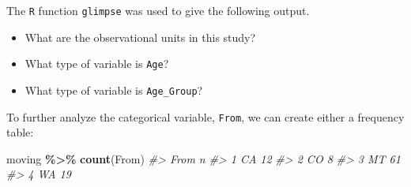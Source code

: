 \documentclass[
]{report}
\newenvironment{Shaded}{\begin{snugshade}}{\end{snugshade}}
\newcommand{\CommentTok}[1]{\textcolor[rgb]{0.56,0.35,0.01}{\textit{#1}}}
\newcommand{\FunctionTok}[1]{\textcolor[rgb]{0.13,0.29,0.53}{\textbf{#1}}}
\newcommand{\NormalTok}[1]{#1}
\newcommand{\SpecialCharTok}[1]{\textcolor[rgb]{0.81,0.36,0.00}{\textbf{#1}}}
\providecommand{\tightlist}{%
  \setlength{\itemsep}{0pt}\setlength{\parskip}{0pt}}
\begin{document}
The \texttt{R} function \texttt{glimpse} was used to give the following output.

\begin{Shaded}
\end{Shaded}

\begin{itemize}
\tightlist
\item
  What are the observational units in this study?
\end{itemize}

\vspace{0.3in}

\begin{itemize}
\tightlist
\item
  What type of variable is \texttt{Age}?
\end{itemize}

\vspace{0.3in}

\begin{itemize}
\tightlist
\item
  What type of variable is \texttt{Age\_Group}?
\end{itemize}

To further analyze the categorical variable, \texttt{From}, we can create either a frequency table:

\begin{Shaded}
\begin{Highlighting}[]
\NormalTok{moving }\SpecialCharTok{\%\textgreater{}\%}
    \FunctionTok{count}\NormalTok{(From)}
\CommentTok{\#\textgreater{}   From  n}
\CommentTok{\#\textgreater{} 1   CA 12}
\CommentTok{\#\textgreater{} 2   CO  8}
\CommentTok{\#\textgreater{} 3   MT 61}
\CommentTok{\#\textgreater{} 4   WA 19}
\end{Highlighting}
\end{Shaded}
\end{document}
